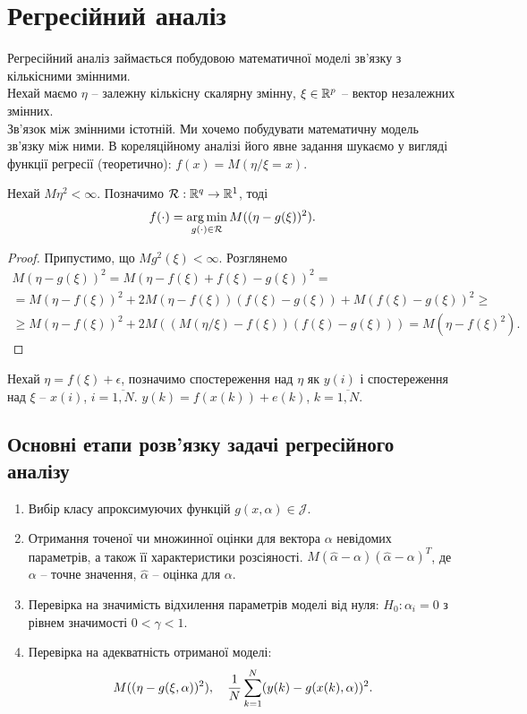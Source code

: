 \section{Регресійний аналіз}
Регресійний аналіз займається побудовою математичної моделі зв'язку з кількісними змінними. \\

Нехай маємо $\eta$ -- залежну кількісну скалярну змінну, $\xi \in \mathbb{R}^p$ -- вектор незалежних змінних.\\

Зв'язок між змінними істотній. Ми хочемо побудувати математичну модель зв'язку між ними. В кореляційному аналізі його явне задання шукаємо у вигляді функції регресії (теоретично): $f(x)=M(\eta/\xi=x)$.
\begin{lemma}
	Нехай $M\eta^2<\infty$. Позначимо $\mathcal{R}: \mathbb{R}^q\to\mathbb{R}^1$, тоді \[f(\cdot)=\operatorname*{arg\,min}_{g(\cdot)\in\mathcal{R}} M((\eta-g(\xi))^2).\]
\end{lemma}
\begin{proof}
	Припустимо, що $Mg^2(\xi)<\infty$. Розглянемо 
	\begin{multline*}
		M(\eta-g(\xi))^2 = M(\eta-f(\xi)+f(\xi)-g(\xi))^2 = \\
		= M(\eta-f(\xi))^2 + 2M(\eta-f(\xi))(f(\xi)-g(\xi))+M(f(\xi)-g(\xi))^2 \ge \\
		\ge M(\eta-f(\xi))^2 + 2M\left((M(\eta/\xi)-f(\xi))(f(\xi)-g(\xi))\right) = M(\eta-f(\xi)^2).
	\end{multline*}
\end{proof}
Нехай $\eta=f(\xi)+\epsilon$, позначимо спостереження над $\eta$ як $y(i)$ і спостереження над $\xi$ -- $x(i)$, $i = \overline{1, N}$. $y(k) = f(x(k)) + e(k)$, $k=\overline{1,N}$.
\subsection{Основні етапи розв'язку задачі регресійного аналізу}
\begin{enumerate}
	\item Вибір класу апроксимуючих функцій $g(x,\alpha)\in\mathcal{J}$.
	\item Отримання точеної чи множинної оцінки для вектора $\alpha$ невідомих параметрів, а також її характеристики розсіяності. $M(\widehat{\alpha}-\alpha)(\widehat{\alpha}-\alpha)^T$, де $\alpha$ -- точне значення, $\widehat{\alpha}$ -- оцінка для $\alpha$.
	\item Перевірка на значимість відхилення параметрів моделі від нуля: $H_0: \alpha_i = 0$ з рівнем значимості $0 < \gamma < 1$.
	\item Перевірка на адекватність отриманої моделі: \[ M((\eta-g(\xi,\alpha))^2), \quad \dfrac{1}{N}\displaystyle\sum\limits_{k=1}^N (y(k)-g(x(k),\alpha))^2. \]
\end{enumerate}
